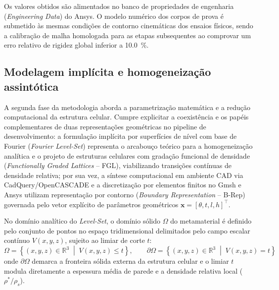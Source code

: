 Os valores obtidos são alimentados no banco de propriedades de engenharia (\textit{Engineering Data}) do Ansys. O modelo numérico dos corpos de prova é submetido às mesmas condições de contorno cinemáticas dos ensaios físicos, sendo a calibração de malha homologada para as etapas subsequentes ao comprovar um erro relativo de rigidez global inferior a \SI{10.0}{\percent}.

\subsection{Modelagem implícita e homogeneização assintótica}
\label{subsec:implicita}

A segunda fase da metodologia aborda a parametrização matemática e a redução computacional da estrutura celular. Cumpre explicitar a coexistência e os papéis complementares de duas representações geométricas no pipeline de desenvolvimento: a formulação implícita por superfícies de nível com base de Fourier (\textit{Fourier Level-Set}) representa o arcabouço teórico para a homogeneização analítica e o projeto de estruturas celulares com gradação funcional de densidade (\textit{Functionally Graded Lattices} -- FGL), viabilizando transições contínuas de densidade relativa; por sua vez, a síntese computacional em ambiente CAD via CadQuery/OpenCASCADE e a discretização por elementos finitos no Gmsh e Ansys utilizam representação por contorno (\textit{Boundary Representation} -- B-Rep) governada pelo vetor explícito de parâmetros geométricos $\mathbf{x} = [\theta, t, l, h]^\top$.

No domínio analítico do \textit{Level-Set}, o domínio sólido $\Omega$ do metamaterial é definido pelo conjunto de pontos no espaço tridimensional delimitados pelo campo escalar contínuo $V(x,y,z)$, sujeito ao limiar de corte $t$:
\begin{equation}
  \Omega = \left\{ (x,y,z) \in \mathbb{R}^3 \;\middle|\; V(x,y,z) \le t \right\}, \qquad \partial\Omega = \left\{ (x,y,z) \in \mathbb{R}^3 \;\middle|\; V(x,y,z) = t \right\}
  \label{eq:iso}
\end{equation}
onde $\partial\Omega$ demarca a fronteira sólida externa da estrutura celular e o limiar $t$ modula diretamente a espessura média de parede e a densidade relativa local ($\rho^{*}/\rho_s$).

